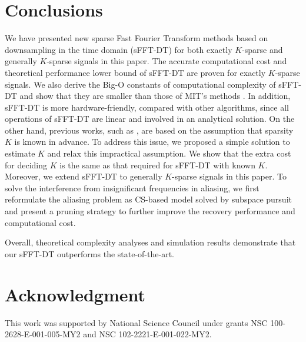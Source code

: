\documentclass[journal,onecolumn,11pt]{IEEEtran}
\begin{document}
\section{Conclusions}\label{Sec: Conclusions}
We have presented new sparse Fast Fourier Transform methods based on downsampling in the time domain (sFFT-DT) for both exactly $K$-sparse and generally $K$-sparse signals in this paper.
The accurate computational cost and theoretical performance lower bound of sFFT-DT are proven for exactly $K$-sparse signals.
We also derive the Big-O constants of computational complexity of sFFT-DT and show that they are smaller than those of MIT's methods \cite{Haitham2012}\cite{Haitham2012_1}\cite{Ghazi2013}.
In addition, sFFT-DT is more hardware-friendly, compared with other algorithms, since all operations of sFFT-DT are linear and involved in an analytical solution.
On the other hand, previous works, such as \cite{Haitham2012}\cite{Haitham2012_1}\cite{Ghazi2013}, are based on the assumption that sparsity $K$ is known in advance.
To address this issue, we proposed a simple solution to estimate $K$ and relax this impractical assumption.
We show that the extra cost for deciding $K$ is the same as that required for sFFT-DT with known $K$.
Moreover, we extend sFFT-DT to generally $K$-sparse signals in this paper.
To solve the interference from insignificant frequencies in aliasing, we first reformulate the aliasing problem as CS-based model solved by subspace pursuit and present a pruning strategy to further improve the recovery performance and computational cost.

Overall, theoretical complexity analyses and simulation results demonstrate that our sFFT-DT outperforms the state-of-the-art.




\section{Acknowledgment}
This work was supported by National Science Council under grants NSC 100-2628-E-001-005-MY2 and NSC 102-2221-E-001-022-MY2.
\end{document}
